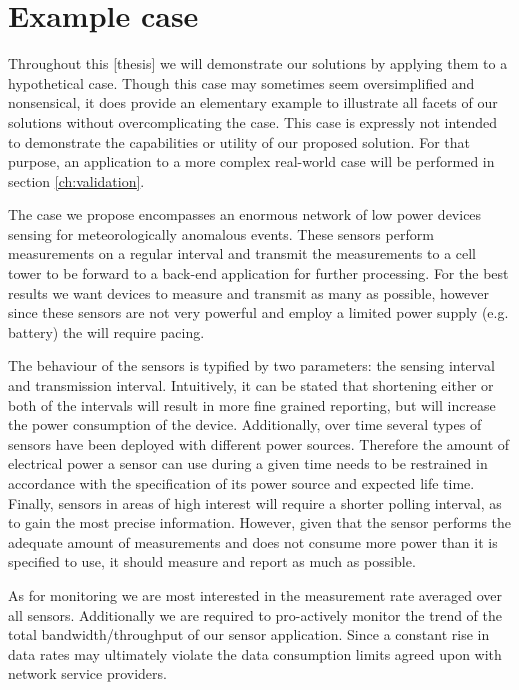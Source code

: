 \section{Example case}
\label{sec:example_case}
Throughout this [thesis] we will demonstrate our solutions by applying them to a hypothetical case. Though this case may sometimes seem oversimplified and nonsensical, it does provide an elementary example to illustrate all facets of our solutions without overcomplicating the case. This case is expressly not intended to demonstrate the capabilities or utility of our proposed solution. For that purpose, an application to a more complex real-world case will be performed in section \ref{ch:validation}. 

The case we propose encompasses an enormous network of low power devices sensing for meteorologically anomalous events. These sensors perform measurements on a regular interval and transmit the measurements to a cell tower to be forward to a back-end application for further processing. For the best results we want devices to measure and transmit as many as possible, however since these sensors are not very powerful and employ a limited power supply (e.g. battery) the will require pacing.

The behaviour of the sensors is typified by two parameters: the sensing interval and transmission interval. Intuitively, it can be stated that shortening either or both of the intervals will result in more fine grained reporting, but will increase the power consumption of the device. Additionally, over time several types of sensors have been deployed with different power sources. Therefore the amount of electrical power a sensor can use during a given time needs to be restrained in accordance with the specification of its power source and expected life time. Finally, sensors in areas of high interest will require a shorter polling interval, as to gain the most precise information. However, given that the sensor performs the adequate amount of measurements and does not consume more power than it is specified to use, it should measure and report as much as possible.

As for monitoring we are most interested in the measurement rate averaged over all sensors. Additionally we are required to pro-actively monitor the trend of the total bandwidth/throughput of our sensor application. Since a constant rise in data rates may ultimately violate the data consumption limits agreed upon with network service providers.

